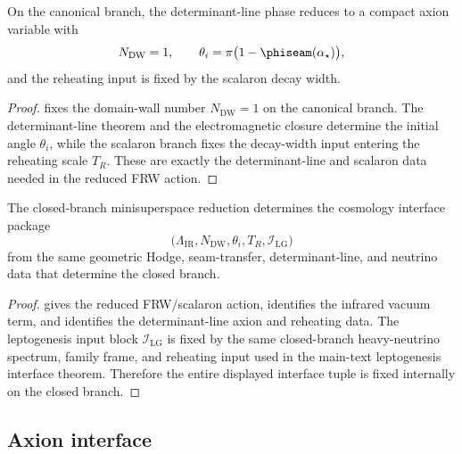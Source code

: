 \begin{lemma}
\label{lem:determinant-line-axion-reduction}
On the canonical branch, the determinant-line phase reduces to a compact axion variable with
\[
N_{\mathrm{DW}}=1,
\qquad
\theta_i=\pi\bigl(1-\phiseam(\alpha_\star)\bigr),
\]
and the reheating input is fixed by the scalaron decay width.
\end{lemma}

\begin{proof}
 fixes the domain-wall number $N_{\mathrm{DW}}=1$ on the
canonical branch. The determinant-line theorem and the electromagnetic closure determine the initial
angle $\theta_i$, while the scalaron branch fixes the decay-width input entering the reheating scale
$T_R$. These are exactly the determinant-line and scalaron data needed in the reduced FRW action.
\end{proof}

\begin{theorem}
\label{thm:full-frw-interface-theorem}
The closed-branch minisuperspace reduction determines the cosmology interface package
\[
\bigl(\Lambda_{\mathrm{IR}},N_{\mathrm{DW}},\theta_i,T_R,\mathcal I_{\mathrm{LG}}\bigr)
\]
from the same geometric Hodge, seam-transfer, determinant-line, and neutrino data that determine
the closed branch.
\end{theorem}

\begin{proof}
 gives the reduced FRW/scalaron action,
 identifies the infrared vacuum term, and
 identifies the determinant-line axion and reheating
data. The leptogenesis input block $\mathcal I_{\mathrm{LG}}$ is fixed by the same closed-branch
heavy-neutrino spectrum, family frame, and reheating input used in the main-text leptogenesis
interface theorem. Therefore the entire displayed interface tuple is fixed internally on the closed
branch.
\end{proof}


\subsection{Axion interface}

